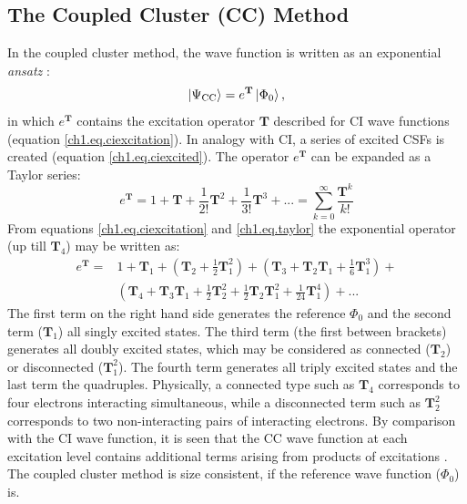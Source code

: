 \subsection{The Coupled Cluster (CC) Method}
In the coupled cluster method, the wave function is written as an exponential \textit{ansatz} \cite{cc1,cc2}:
\begin{equation}
\Ket{\Psi_{\mathrm{CC}}}  = e^{\mathbf{T}}\Ket{\Phi_{0}},
\end{equation}
in which $e^\mathbf{T}$ contains the excitation operator $\mathbf{T}$ described for CI wave functions (equation \ref{ch1.eq.ciexcitation}). In analogy with CI, a series of excited CSFs is created (equation \ref{ch1.eq.ciexcited}).  The operator $e^{\mathbf{T}}$ can be expanded as a Taylor series:
\begin{equation}
e^{\mathbf{T}} = 1 + \mathbf{T} + \frac{1}{2!}\mathbf{T}^2 + \frac{1}{3!}\mathbf{T}^3 + ... = \sum_{k=0}^{\infty} \frac{\mathbf{T}^k}{k!}
\label{ch1.eq.taylor}
\end{equation}
From equations \ref{ch1.eq.ciexcitation} and \ref{ch1.eq.taylor} the exponential operator (up till $\mathbf{T}_4$) may be written as:
\begin{equation}
\begin{split}
e^{\mathbf{T}} = & 1 + \mathbf{T}_1 + (\mathbf{T}_2 + \frac{1}{2}\mathbf{T}_1^2) + (\mathbf{T}_3 + \mathbf{T}_2\mathbf{T}_1 + \frac{1}{6}\mathbf{T}_1^3) + \\
& (\mathbf{T}_4 + \mathbf{T}_3\mathbf{T}_1 + \frac{1}{2}\mathbf{T}_2^2 + \frac{1}{2}\mathbf{T}_2\mathbf{T}_1^2 + \frac{1}{24} \mathbf{T}_1^4) + ...
\end{split}
\end{equation}
The first term on the right hand side generates the reference $\Phi_0$ and the second term ($\mathbf{T}_1$) all singly excited states. The third term (the first between brackets) generates all doubly excited states, which may be considered as connected ($\mathbf{T}_2$) or disconnected ($\mathbf{T}_1^2$). The fourth term  generates all triply excited states and the last term the quadruples. Physically, a connected type such as $\mathbf{T}_4$ corresponds to four electrons interacting simultaneous, while a disconnected term such as $\mathbf{T}_2^2$ corresponds to two non-interacting pairs of interacting electrons. By comparison with the CI wave function, it is seen that the CC wave function at each excitation level contains additional terms arising from products of excitations \cite{jensen}. The coupled cluster method is size consistent, if the reference wave function ($\Phi_0$) is.

